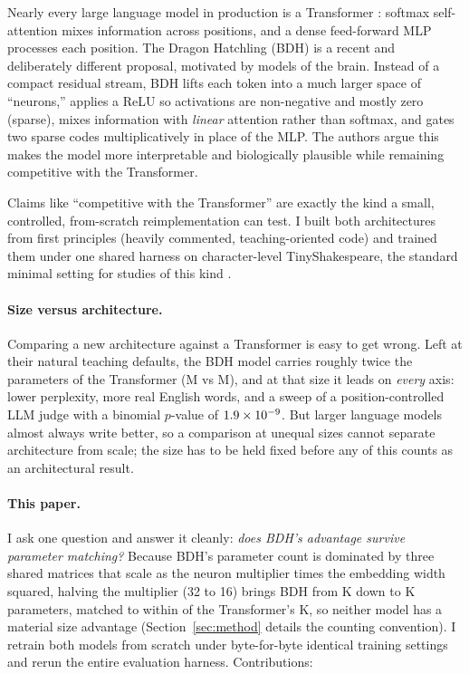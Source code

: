 \documentclass[11pt]{article}
\begin{document}
Nearly every large language model in production is a Transformer
\cite{vaswani2017attention}: softmax self-attention mixes information across
positions, and a dense feed-forward MLP processes each position. The Dragon
Hatchling (BDH) \cite{kosowski2025bdh} is a recent and deliberately different
proposal, motivated by models of the brain. Instead of a compact residual
stream, BDH lifts each token into a much larger space of ``neurons,'' applies a
ReLU so activations are non-negative and mostly zero (sparse), mixes information
with \emph{linear} attention \cite{katharopoulos2020linear} rather than softmax,
and gates two sparse codes multiplicatively in place of the MLP. The authors
argue this makes the model more interpretable and biologically plausible while
remaining competitive with the Transformer.

Claims like ``competitive with the Transformer'' are exactly the kind a small,
controlled, from-scratch reimplementation can test. I built both architectures
from first principles (heavily commented, teaching-oriented code) and trained
them under one shared harness on character-level TinyShakespeare, the standard
minimal setting for studies of this kind \cite{karpathy2022nanogpt}.

\paragraph{Size versus architecture.} Comparing a new architecture against a
Transformer is easy to get wrong. Left at their natural teaching defaults, the
BDH model carries roughly twice the parameters of the Transformer
(\BdhBigParamsM{}M vs \GptParamsM{}M), and at that size it leads on \emph{every}
axis: lower perplexity, more real English words, and a \JudgeBigScore{} sweep of
a position-controlled LLM judge with a binomial $p$-value of $1.9\times10^{-9}$. But
larger language models almost always write better, so a comparison at unequal
sizes cannot separate architecture from scale; the size has to be held fixed
before any of this counts as an architectural result.

\paragraph{This paper.} I ask one question and answer it cleanly: \emph{does
BDH's advantage survive parameter matching?} Because BDH's parameter count is
dominated by three shared matrices that scale as the neuron multiplier times the
embedding width squared, halving the multiplier (32 to 16) brings BDH from
\BdhBigParamsK{}K down to \BdhParamsK{}K parameters, matched to within
\MatchPct{} of the Transformer's \GptParamsK{}K, so neither model has a material
size advantage (Section~\ref{sec:method} details the counting convention). I
retrain both models from scratch under byte-for-byte identical
training settings and rerun the entire evaluation harness. Contributions:
\end{document}
